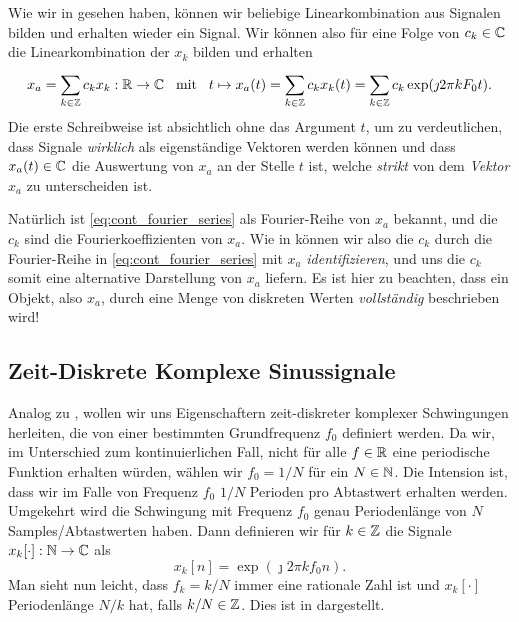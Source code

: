 Wie wir in  gesehen haben, können wir beliebige Linearkombination aus Signalen bilden und erhalten wieder ein Signal.
Wir können also für eine Folge von $c_k \in \mathbb{C}$ die Linearkombination der $x_k$ bilden und erhalten
%
\begin{equation}\label{eq:cont_fourier_series}
    x_a = {\sum\limits_{k \in \mathbb{Z}}^{}{c_k x_k}} : \mathbb{R} \rightarrow \mathbb{C}
    {\hspace{3mm} \text{mit} \hspace{3mm}} 
    t \mapsto x_a(t) = {\sum\limits_{k \in \mathbb{Z}}^{}{c_k x_k(t)}}
        = {\sum\limits_{k \in \mathbb{Z}}^{}{c_k \exp(\jmath 2 \pi k F_0 t)}}.
\end{equation}
%
Die erste Schreibweise ist absichtlich ohne das Argument $t$, um zu verdeutlichen, dass Signale \emph{wirklich} als eigenständige Vektoren werden können und dass $x_a(t) \in \mathbb{C}$  die Auswertung von $x_a$ an der Stelle $t$ ist, welche \emph{strikt} von dem \emph{Vektor} $x_a$ zu unterscheiden ist.

Natürlich ist \eqref{eq:cont_fourier_series} als Fourier-Reihe von $x_a$ bekannt, und die $c_k$ sind die Fourierkoeffizienten von $x_a$.
Wie in  können wir also die $c_k$ durch die Fourier-Reihe in \eqref{eq:cont_fourier_series} mit $x_a$ \emph{identifizieren}, und uns die $c_k$ somit eine alternative Darstellung von $x_a$ liefern.
Es ist hier zu beachten, dass ein  Objekt, also $x_a$, durch eine Menge von diskreten Werten \emph{vollständig} beschrieben wird!
%
%
%
%
\subsection{Zeit-Diskrete Komplexe Sinussignale}\label{sec:sampling:disc_sin}
%
Analog zu , wollen wir uns Eigenschaftern zeit-diskreter komplexer Schwingungen herleiten, die von einer bestimmten Grundfrequenz $f_0$ definiert werden.
Da wir, im Unterschied zum kontinuierlichen Fall, nicht für alle $f \in \mathbb{R}$ eine periodische Funktion erhalten würden, wählen wir $f_0 = 1/N$ für ein $N \in \mathbb{N}$. 
Die Intension ist, dass wir im Falle von Frequenz $f_0$ $1/N$ Perioden pro Abtastwert erhalten werden. 
Umgekehrt wird die Schwingung mit Frequenz $f_0$ genau Periodenlänge von $N$ Samples/Abtastwerten haben.
Dann definieren wir für $k \in \mathbb{Z}$ die Signale $x_k[\cdot]: \mathbb{N} \rightarrow \mathbb{C}$ als
%
\begin{equation}\label{eq:disc_harms_comp}
    x_k[n] = \exp\left(
        \jmath 2 \pi k f_0 n
    \right).
\end{equation}
%
Man sieht nun leicht, dass $f_k = k/N$ immer eine rationale Zahl ist und $x_k[\cdot]$ Periodenlänge $N/k$ hat, falls $k/N \in \mathbb{Z}$.
Dies ist in  dargestellt.

